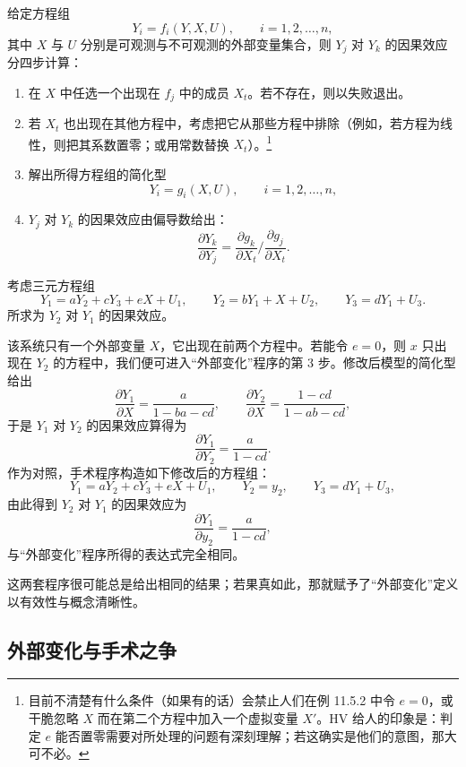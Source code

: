 给定方程组
\[
Y_i=f_i(Y,X,U),\qquad i=1,2,\dots,n,
\]
其中 $X$ 与 $U$ 分别是可观测与不可观测的外部变量集合，则 $Y_j$ 对 $Y_k$ 的因果效应分四步计算：

\begin{enumerate}[label=\arabic*.,leftmargin=1.8em]
\item 在 $X$ 中任选一个出现在 $f_j$ 中的成员 $X_t$。若不存在，则以失败退出。
\item 若 $X_t$ 也出现在其他方程中，考虑把它从那些方程中排除（例如，若方程为线性，则把其系数置零；或用常数替换 $X_t$）。\footnote{目前不清楚有什么条件（如果有的话）会禁止人们在例 11.5.2 中令 $e=0$，或干脆忽略 $X$ 而在第二个方程中加入一个虚拟变量 $X'$。HV 给人的印象是：判定 $e$ 能否置零需要对所处理的问题有深刻理解；若这确实是他们的意图，那大可不必。}
\item 解出所得方程组的简化型
\begin{equation}
Y_i=g_i(X,U),\qquad i=1,2,\dots,n, \tag{11.23}
\end{equation}
\item $Y_j$ 对 $Y_k$ 的因果效应由偏导数给出：
\begin{equation}
\frac{\partial Y_k}{\partial Y_j}=\frac{\partial g_k}{\partial X_t}\Big/\frac{\partial g_j}{\partial X_t}. \tag{11.24}
\end{equation}
\end{enumerate}

\begin{example}\label{ex:11.5.2}
考虑三元方程组
\[
Y_1=aY_2+cY_3+eX+U_1,\qquad
Y_2=bY_1+X+U_2,\qquad
Y_3=dY_1+U_3.
\]
所求为 $Y_2$ 对 $Y_1$ 的因果效应。

该系统只有一个外部变量 $X$，它出现在前两个方程中。若能令 $e=0$，则 $x$ 只出现在 $Y_2$ 的方程中，我们便可进入“外部变化”程序的第 3 步。修改后模型的简化型给出
\[
\frac{\partial Y_1}{\partial X}=\frac{a}{1-ba-cd},\qquad
\frac{\partial Y_2}{\partial X}=\frac{1-cd}{1-ab-cd},
\]
于是 $Y_1$ 对 $Y_2$ 的因果效应算得为
\[
\frac{\partial Y_1}{\partial Y_2}=\frac{a}{1-cd}.
\]
作为对照，手术程序构造如下修改后的方程组：
\[
Y_1=aY_2+cY_3+eX+U_1,\qquad
Y_2=y_2,\qquad
Y_3=dY_1+U_3,
\]
由此得到 $Y_2$ 对 $Y_1$ 的因果效应为
\[
\frac{\partial Y_1}{\partial y_2}=\frac{a}{1-cd},
\]
与“外部变化”程序所得的表达式完全相同。
\end{example}

这两套程序很可能总是给出相同的结果；若果真如此，那就赋予了“外部变化”定义以有效性与概念清晰性。

\subsection{外部变化与手术之争}

